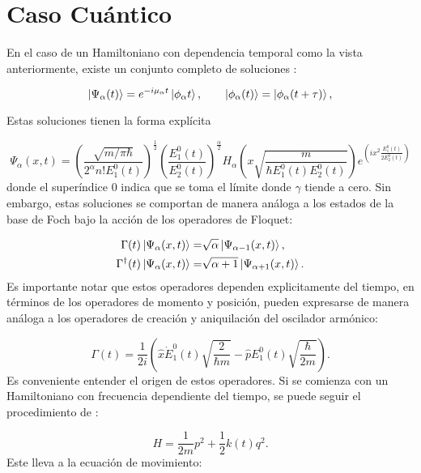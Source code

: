 \documentclass[a4paper,10pt]{report}
\begin{document}
\section{Caso Cuántico}

En el caso de un Hamiltoniano con dependencia temporal como la vista anteriormente, existe un conjunto completo de soluciones \cite{BarnettSD}:

\begin{equation}
\Ket{\Psi_\alpha (t)} = e^{-i\mu_\alpha t}\Ket{\phi_\alpha t}, \qquad \Ket{\phi_\alpha (t)}=\Ket{\phi_\alpha (t+\tau)},
\end{equation}

Estas soluciones tienen la forma explícita\cite{BrownPT}

\begin{equation}
\Psi_\alpha (x,t) = (\frac{\sqrt{m/\pi\hbar}}{2^\alpha n!E_1^0(t)})^{\frac{1}{2}}(\frac{E_1^0(t)}{E_2^0(t)})^\frac{\alpha}{2}H_\alpha(x\sqrt{\frac{m}{\hbar E_1^0(t) E_2^0(t)}})e^{(ix^2\frac{E_1^0(t)}{2E_2^0(t)})}
\end{equation} donde el superíndice 0 indica que se toma el límite donde $\gamma$ tiende a cero. Sin embargo, estas soluciones se comportan de manera análoga a los estados de la base de Foch bajo la acción de los operadores de Floquet:

\begin{align*}\label{FloquetOperators}
\Gamma(t) \Ket{\Psi_\alpha (x,t)} =& \sqrt{\alpha}\Ket{\Psi_{\alpha-1} (x,t)}, \\
\Gamma^\dagger(t) \Ket{\Psi_\alpha (x,t)} =& \sqrt{\alpha+1}\Ket{\Psi_{\alpha+1} (x,t)}.
\end{align*}Es importante notar que estos operadores dependen explicitamente del tiempo, en términos de los operadores de momento y posición, pueden expresarse de manera análoga a los operadores de creación y aniquilación del oscilador armónico:

\begin{equation}
\Gamma(t) = \frac{1}{2i}(\hat{x}\dot{E}_1^0(t)\sqrt{\frac{2}{\hbar m}}-\hat{p}E_1^0(t)\sqrt{\frac{\hbar}{2m}}).
\end{equation}Es conveniente entender el origen de estos operadores. Si se comienza con un Hamiltoniano con frecuencia dependiente del tiempo, se puede seguir el procedimiento de \cite{BrownPT}:

\begin{equation}\label{TDHO}
H = \frac{1}{2m}p^2 + \frac{1}{2}k(t)q^2.
\end{equation} Este lleva a la ecuación de movimiento:
\end{document}
